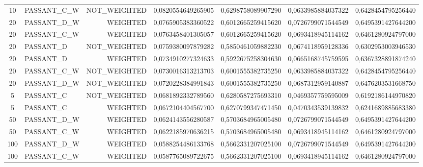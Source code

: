 \begin{table}[H]
{\begin{tabular}{ c l r c c c c }
				10 & PASSANT\_C\_W & NOT\_WEIGHTED & 0,0820554649265905 & 0,6298758089907290 & 0,0633985884037322 & 0,6428454795256440 \\
				
				20 & PASSANT\_D\_W &   WEIGHTED & 0,0765905383360522 & 0,6012665259415620 & 0,0726799071544549 & 0,6495391427644200 \\
				
				20 & PASSANT\_C\_W &   WEIGHTED & 0,0763458401305057 & 0,6012665259415620 & 0,0693418945114162 & 0,6461280924797000 \\
				
				20 &  PASSANT\_D & NOT\_WEIGHTED & 0,0759380097879282 & 0,5850461059882230 & 0,0674118959128336 & 0,6302953003946530 \\
				
				20 &  PASSANT\_D &   WEIGHTED & 0,0734910277324633 & 0,5922675258304630 & 0,0665168745759595 & 0,6367328891874240 \\
				
				20 & PASSANT\_C\_W & NOT\_WEIGHTED & 0,0730016313213703 & 0,6001555382735250 & 0,0633985884037322 & 0,6428454795256440 \\
				
				20 & PASSANT\_D\_W & NOT\_WEIGHTED & 0,0720228384991843 & 0,6001555382735250 & 0,0687312959140887 & 0,6476203531668750 \\
				
				5 &  PASSANT\_C & NOT\_WEIGHTED & 0,0681892332789560 & 0,6280587275693310 & 0,0469357759595009 & 0,6192186144970820 \\
				
				5 &  PASSANT\_C &   WEIGHTED & 0,0672104404567700 & 0,6270799347471450 & 0,0470343539139832 & 0,6241689885683380 \\
				
				50 & PASSANT\_D\_W &   WEIGHTED & 0,0624143556280587 & 0,5703684965005480 & 0,0726799071544549 & 0,6495391427644200 \\
				
				50 & PASSANT\_C\_W &   WEIGHTED & 0,0622185970636215 & 0,5703684965005480 & 0,0693418945114162 & 0,6461280924797000 \\
				
				100 & PASSANT\_D\_W &   WEIGHTED & 0,0588254486133768 & 0,5662331207025100 & 0,0726799071544549 & 0,6495391427644200 \\
				
				100 & PASSANT\_C\_W &   WEIGHTED & 0,0587765089722675 & 0,5662331207025100 & 0,0693418945114162 & 0,6461280924797000 \\
				

\end{tabular}}
\end{table}
